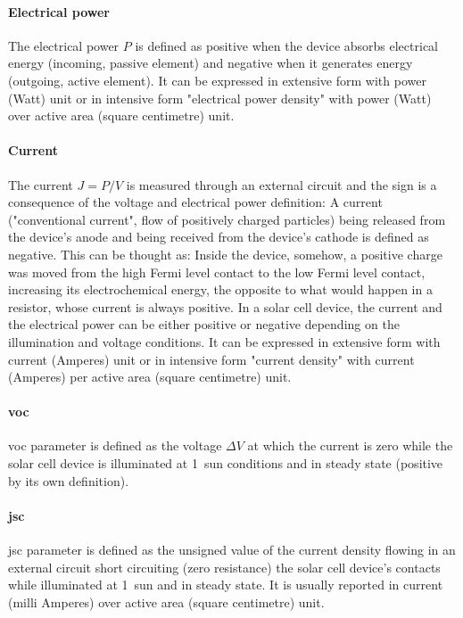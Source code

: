 \paragraph{Electrical power} The electrical power $P$ is defined as positive when the device absorbs electrical energy (incoming, passive element) and negative when it generates energy (outgoing, active element). It can be expressed in extensive form with power (Watt) unit or in intensive form "electrical power density" with power (Watt) over active area (square centimetre) unit.

\paragraph{Current} The current $J=P/V$ is measured through an external circuit and the sign is a consequence of the voltage and electrical power definition: A current ("conventional current", flow of positively charged particles) being released from the device's anode and being received from the device's cathode is defined as negative. This can be thought as: Inside the device, somehow, a positive charge was moved from the high Fermi level contact to the low Fermi level contact, increasing its electrochemical energy, the opposite to what would happen in a resistor, whose current is always positive. In a solar cell device, the current and the electrical power can be either positive or negative depending on the illumination and voltage conditions. It can be expressed in extensive form with current (Amperes) unit or in intensive form "current density" with current (Amperes) per active area (square centimetre) unit.

\paragraph{\Glsdesc{voc}} \Gls{voc} parameter is defined as the voltage $\Delta V$ at which the current is zero while the solar cell device is illuminated at 1~sun conditions and in steady state (positive by its own definition).

\paragraph{\Glsdesc{jsc}} \Gls{jsc} parameter is defined as the unsigned value of the current density flowing in an external circuit short circuiting (zero resistance) the solar cell device's contacts while illuminated at 1~sun and in steady state. It is usually reported in current (milli Amperes) over active area (square centimetre) unit.


